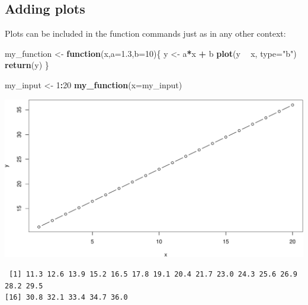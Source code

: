 \documentclass[
]{book}
\newenvironment{Shaded}{\begin{snugshade}}{\end{snugshade}}
\newcommand{\ControlFlowTok}[1]{\textcolor[rgb]{0.13,0.29,0.53}{\textbf{#1}}}
\newcommand{\DataTypeTok}[1]{\textcolor[rgb]{0.13,0.29,0.53}{#1}}
\newcommand{\DecValTok}[1]{\textcolor[rgb]{0.00,0.00,0.81}{#1}}
\newcommand{\FloatTok}[1]{\textcolor[rgb]{0.00,0.00,0.81}{#1}}
\newcommand{\KeywordTok}[1]{\textcolor[rgb]{0.13,0.29,0.53}{\textbf{#1}}}
\newcommand{\NormalTok}[1]{#1}
\newcommand{\OperatorTok}[1]{\textcolor[rgb]{0.81,0.36,0.00}{\textbf{#1}}}
\newcommand{\StringTok}[1]{\textcolor[rgb]{0.31,0.60,0.02}{#1}}
\begin{document}
\hypertarget{adding-plots}{%
\subsection*{Adding plots}\label{adding-plots}}

Plots can be included in the function commands just as in any other context:

\begin{Shaded}
\begin{Highlighting}[]
\NormalTok{my_function <-}\StringTok{ }\ControlFlowTok{function}\NormalTok{(x,}\DataTypeTok{a=}\FloatTok{1.3}\NormalTok{,}\DataTypeTok{b=}\DecValTok{10}\NormalTok{)\{}
\NormalTok{  y <-}\StringTok{ }\NormalTok{a}\OperatorTok{*}\NormalTok{x }\OperatorTok{+}\StringTok{ }\NormalTok{b}
  \KeywordTok{plot}\NormalTok{(y }\OperatorTok{~}\StringTok{ }\NormalTok{x, }\DataTypeTok{type=}\StringTok{"b"}\NormalTok{)}
  \KeywordTok{return}\NormalTok{(y)}
\NormalTok{\}}
\end{Highlighting}
\end{Shaded}

\begin{Shaded}
\begin{Highlighting}[]
\NormalTok{my_input <-}\StringTok{ }\DecValTok{1}\OperatorTok{:}\DecValTok{20}
\KeywordTok{my_function}\NormalTok{(}\DataTypeTok{x=}\NormalTok{my_input)}
\end{Highlighting}
\end{Shaded}

\includegraphics{figures/unnamed-chunk-290-1.pdf}

\begin{verbatim}
 [1] 11.3 12.6 13.9 15.2 16.5 17.8 19.1 20.4 21.7 23.0 24.3 25.6 26.9 28.2 29.5
[16] 30.8 32.1 33.4 34.7 36.0
\end{verbatim}
\end{document}
